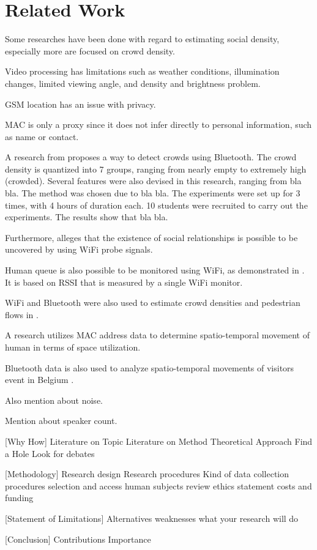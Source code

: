 \chapter{Related Work}\label{ch:related-work}

Some researches have been done with regard to estimating social density, especially more are focused on crowd density.

Video processing has limitations such as weather conditions, illumination changes, limited viewing angle, and density and brightness problem. 

GSM location has an issue with privacy\cite{thesis017}.

MAC is only a proxy since it does not infer directly to personal information, such as name or contact.

A research from \cite{thesis008} proposes a way to detect crowds using Bluetooth. The crowd density is quantized into 7 groups, ranging from nearly empty to extremely high (crowded). Several features were also devised in this research, ranging from bla bla. 
The method was chosen due to bla bla.
The experiments were set up for 3 times, with 4 hours of duration each. 10 students were recruited to carry out the experiments.
The results show that bla bla.

Furthermore, \cite{thesis014} alleges that the existence of social relationships is possible to be uncovered by using WiFi probe signals.

Human queue is also possible to be monitored using WiFi, as demonstrated in \cite{thesis012}. It is based on RSSI that is measured by a single WiFi monitor.

WiFi and Bluetooth were also used to estimate crowd densities and pedestrian flows in \cite{thesis011}.

A research \cite{thesis017} utilizes MAC address data to determine spatio-temporal movement of human in terms of space utilization.

Bluetooth data is also used to analyze spatio-temporal movements of visitors event in Belgium \cite{thesis016}.


Also mention about noise.

Mention about speaker count.

[Why How]
Literature on Topic
Literature on Method
Theoretical Approach
Find a Hole
Look for debates


[Methodology]
Research design
Research procedures
Kind of data
collection procedures
selection and access
human subjects review
ethics statement
costs and funding

[Statement of Limitations]
Alternatives
weaknesses
what your research will do

[Conclusion]
Contributions
Importance
